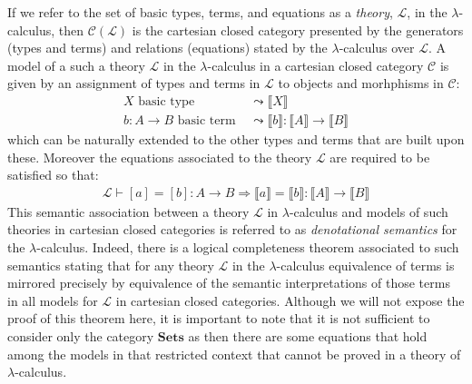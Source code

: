 If we refer to the set of basic types, terms, and equations as a \emph{theory}, $\mathcal{L}$, in the $\lambda$-calculus, then $\mathcal{C}(\mathcal{L})$ is the cartesian closed category presented by the generators (types and terms) and relations (equations) stated by the $\lambda$-calculus over $\mathcal{L}$. A model of a such a theory $\mathcal{L}$ in the $\lambda$-calculus in a cartesian closed category $\mathcal{C}$ is given by an assignment of types and terms in $\mathcal{L}$ to objects and morhphisms in $\mathcal{C}$:
\begin{align*}
X \mbox{ basic type } &\leadsto \llbracket X \rrbracket\\
b \colon A \rightarrow B \mbox{ basic term } &\leadsto \llbracket b \rrbracket \colon \llbracket A \rrbracket \rightarrow \llbracket B \rrbracket
\end{align*}
which can be naturally extended to the other types and terms that are built upon these. Moreover the equations associated to the theory $\mathcal{L}$ are required to be satisfied so that:
\begin{align*}
\mathcal{L} \vdash [a]=[b] \colon A \rightarrow B \Longrightarrow \llbracket a \rrbracket = \llbracket b \rrbracket \colon \llbracket A \rrbracket \rightarrow \llbracket B \rrbracket
\end{align*}
This semantic association between a theory $\mathcal{L}$ in $\lambda$-calculus and models of such theories in cartesian closed categories is referred to as \emph{denotational semantics} for the $\lambda$-calculus. Indeed, there is a logical completeness theorem associated to such semantics stating that for any theory $\mathcal{L}$ in the $\lambda$-calculus equivalence of terms is mirrored precisely by equivalence of the semantic interpretations of those terms in all models for $\mathcal{L}$ in cartesian closed categories. Although we will not expose the proof of this theorem here, it is important to note that it is not sufficient to consider only the category $\mathbf{Sets}$ as then there are some equations that hold among the models in that restricted context that cannot be proved in a theory of $\lambda$-calculus.